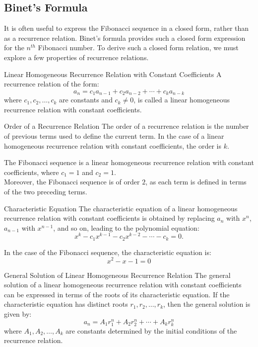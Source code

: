 \documentclass[openany]{book}
\begin{document}
\subsection{Binet's Formula}
It is often useful to express the Fibonacci sequence in a closed form, rather than as a recurrence relation. Binet's formula provides such a closed form expression for the $n^{th}$ Fibonacci number. To derive such a closed form relation, we must explore a few properties of recurrence relations.  \\
\begin{mydefinition}{Linear Homogeneous Recurrence Relation with Constant Coefficients}
    A recurrence relation of the form:
    \[
        a_n = c_1 a_{n-1} + c_2 a_{n-2} + \cdots + c_k a_{n-k}
    \]
    where $c_1, c_2, \ldots, c_k$ are constants and $c_k \neq 0$, is called a linear homogeneous recurrence relation with constant coefficients.
\end{mydefinition}
\begin{mydefinition}{Order of a Recurrence Relation}
    The order of a recurrence relation is the number of previous terms used to define the current term. In the case of a linear homogeneous recurrence relation with constant coefficients, the order is $k$.
\end{mydefinition}
The Fibonacci sequence is a linear homogeneous recurrence relation with constant coefficients, where $c_1 = 1$ and $c_2 = 1$. \\
Moreover, the Fibonacci sequence is of order $2$, as each term is defined in terms of the two preceding terms. \\
\begin{mydefinition}{Characteristic Equation}
    The characteristic equation of a linear homogeneous recurrence relation with constant coefficients is obtained by replacing $a_n$ with $x^n$, $a_{n-1}$ with $x^{n-1}$, and so on, leading to the polynomial equation:
    \[
        x^k - c_1 x^{k-1} - c_2 x^{k-2} - \cdots - c_k = 0.
    \]
\end{mydefinition}
In the case of the Fibonacci sequence, the characteristic equation is:
\[
    x^2 - x - 1 = 0
\]
\begin{mytheorem}{General Solution of Linear Homogeneous Recurrence Relation}
    The general solution of a linear homogeneous recurrence relation with constant coefficients can be expressed in terms of the roots of its characteristic equation. If the characteristic equation has distinct roots $r_1, r_2, \ldots, r_k$, then the general solution is given by:
    \[
        a_n = A_1 r_1^n + A_2 r_2^n + \cdots + A_k r_k^n
    \]
    where $A_1, A_2, \ldots, A_k$ are constants determined by the initial conditions of the recurrence relation.
\end{mytheorem}
\end{document}
